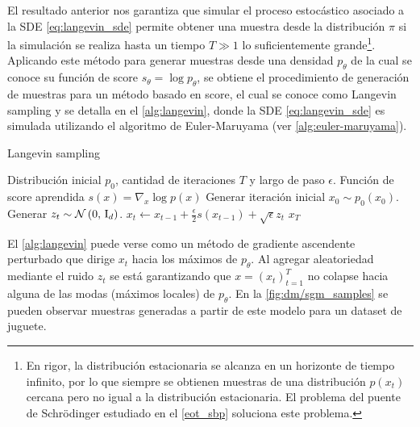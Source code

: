 El resultado anterior nos garantiza que simular el proceso estocástico asociado a la SDE \eqref{eq:langevin_sde} permite obtener una muestra desde la distribución $\pi$ si la simulación se realiza hasta un tiempo $T\gg 1$ lo suficientemente grande\footnote{En rigor, la distribución estacionaria se alcanza en un horizonte de tiempo infinito, por lo que siempre se obtienen muestras de una distribución $p(x_t)$ cercana pero no igual a la distribución estacionaria. El problema del puente de Schrödinger estudiado en el \autoref{eot_sbp} soluciona este problema.}. Aplicando este método para generar muestras desde una densidad $p_\theta$ de la cual se conoce su función de score $s_\theta=\log p_\theta$, se obtiene el procedimiento de generación de muestras para un método basado en score, el cual se conoce como Langevin sampling y se detalla en el \autoref{alg:langevin}, donde la SDE \eqref{eq:langevin_sde} es simulada utilizando el algoritmo de Euler-Maruyama (ver \autoref{alg:euler-maruyama}).

\begin{algorithm}
    \caption{Langevin sampling}
    \label{alg:langevin}
    \begin{algorithmic}[1]
        \Require Distribución inicial $p_0$, cantidad de iteraciones $T$ y largo de paso $\epsilon$.
        \Require Función de score aprendida $s(x) = \nabla_x \log p(x)$
        \State Generar iteración inicial $x_0\sim p_0(x_0)$.
        \State Generar $z_t\sim \mathcal{N}\left(0,\,\operatorname{I}_{d}\right)$.
        \State $x_t\gets x_{t-1} + \frac{\epsilon}{2}s(x_{t-1}) + \sqrt{\epsilon} z_t$
        \EndFor
        \State\Return $x_T$
    \end{algorithmic}
\end{algorithm}

El \autoref{alg:langevin} puede verse como un método de gradiente ascendente perturbado que dirige $x_t$ hacia los máximos de $p_\theta$. Al agregar aleatoriedad mediante el ruido $z_t$ se está garantizando que $x=(x_t)_{t=1}^T$ no colapse hacia alguna de las modas (máximos locales) de $p_\theta$. En la \autoref{fig:dm/sgm_samples} se pueden observar muestras generadas a partir de este modelo para un dataset de juguete.


